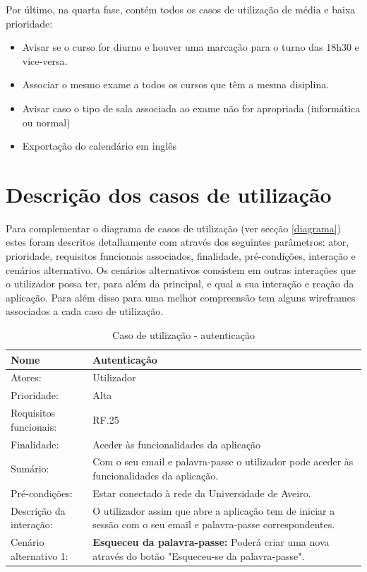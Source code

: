 \documentclass[11pt, twoside]{report}
\begin{document}
	Por último, na quarta fase, contém todos os casos de utilização de média e baixa prioridade:
	\begin{itemize}
		\item Avisar se o curso for diurno e houver uma marcação para o turno das 18h30 e vice-versa.
		\item Associar o mesmo exame a todos os cursos que têm a mesma disiplina.
		\item Avisar caso o tipo de sala associada ao exame não for apropriada (informática ou normal)
		\item Exportação do calendário em inglês
	\end{itemize}

	
	\section{Descrição dos casos de utilização}
	\label{descricaousecase}
	
	Para complementar o diagrama de casos de utilização (ver secção \ref{diagrama}) estes foram descritos detalhamente com através dos seguintes parâmetros: ator, prioridade, requisitos funcionais associados, finalidade, pré-condições, interação e cenários alternativo. Os cenários alternativos consistem em outras interações que o utilizador possa ter, para além da principal, e qual a sua interação e reação da aplicação. Para além disso para uma melhor compreensão tem alguns wireframes associados a cada caso de utilização.
	
	\def\arraystretch{1.5}
	\begin{table}[H]
		\caption{Caso de utilização - autenticação}
		\begin{center}	
			\begin{tabularx}{\textwidth}{|l|X|}
				\hline
				\textbf{Nome }	& \textbf{Autenticação} \\
				\hline
				Atores: & Utilizador \\
				\hline
				Prioridade: & Alta \\
				\hline
				Requisitos funcionais:& RF.25\\
				\hline
				Finalidade: & Aceder às funcionalidades da aplicação\\
				\hline
				Sumário: & Com o seu email e palavra-passe o utilizador pode aceder às funcionalidades da aplicação.\\
				\hline
				Pré-condições: & Estar conectado à rede da Universidade de Aveiro.\\
				\hline
				Descrição da interação: &  O utilizador assim que abre a aplicação tem de iniciar a sessão com o seu email e palavra-passe correspondentes.\\
				\hline
				Cenário alternativo 1:& \textbf{Esqueceu da palavra-passe:} Poderá criar uma nova através do botão "Esqueceu-se da palavra-passe".\\
				\hline
			\end{tabularx}
		\end{center}
	\end{table}
\end{document}
